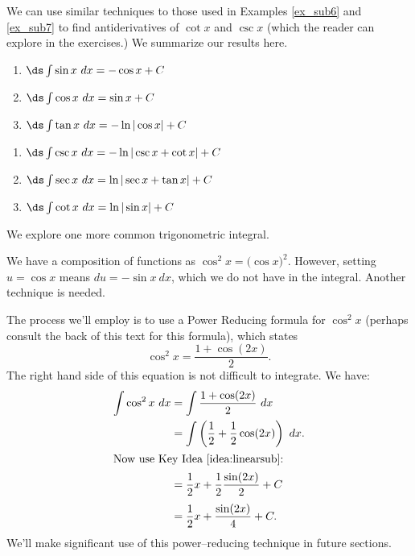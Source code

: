 We can use similar techniques to those used in Examples \ref{ex_sub6} and \ref{ex_sub7} to find antiderivatives of $\cot x$ and $\csc x$ (which the reader can explore in the exercises.) We summarize our results here.

{\begin{minipage}{.45\specialboxlength}\small{}
	\begin{enumerate}
	\item		$\ds \int \sin x \ dx = -\cos x +C$
	\item		$\ds\int \cos x\ dx = \sin x + C$
	\item		$\ds \int \tan x\ dx = -\ln|\cos x|+C$
\end{enumerate}
\end{minipage}
\begin{minipage}{.55\specialboxlength}\small
	\begin{enumerate}\addtocounter{enumi}{3}
	\item		$\ds \int \csc x \ dx = -\ln|\csc x+\cot x| +C$
	\item		$\ds\int \sec x\ dx = \ln|\sec x+\tan x| + C$
	\item		$\ds \int \cot x\ dx = \ln|\sin x|+C$
\end{enumerate}
\end{minipage}
}

We explore one more common trigonometric integral.\\

{We have a composition of functions as $\cos^2x = \big(\cos x\big)^2$. 
However, setting $u = \cos x$ means $du = -\sin x\ dx$, which we do not have in the integral. Another technique is needed.

The process we'll employ is to use a Power Reducing formula for $\cos^2x$ (perhaps consult the back of this text for this formula), which states 
	$$\cos ^2x = \frac{1+\cos(2x)}{2}.$$
	The right hand side of this equation is not difficult to integrate. We have:
\begin{align*}
	\int \cos^2x\ dx &= \int \frac{1+\cos(2x)}2\ dx \\
									&=	\int \left( \frac12 + \frac12\cos(2x)\right)\ dx. \\
\intertext{Now use Key Idea \ref{idea:linearsub}:}
									&= \frac12x + \frac12\frac{\sin(2x)}{2} + C \rule[-10pt]{0pt}{5pt}\\
									&= \frac12x + \frac{\sin(2x)}4 + C.
\end{align*}
We'll make significant use of this power--reducing technique in future sections.
}\\


